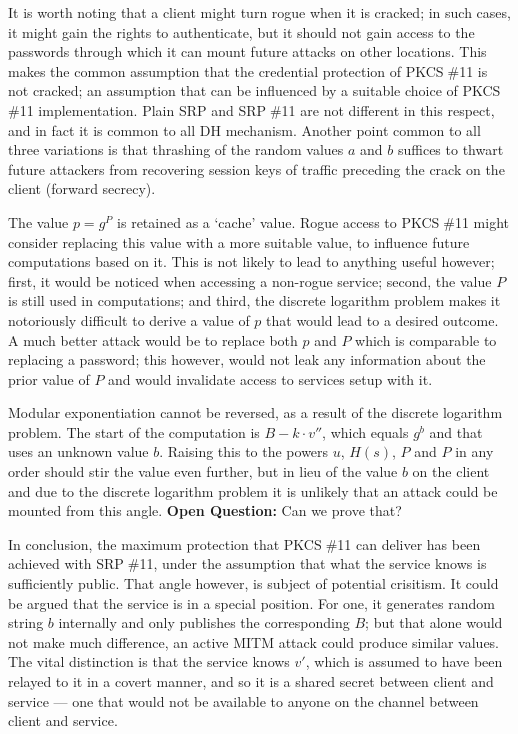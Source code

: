 \documentclass[a4paper,11pt]{article}
\def\pkcs11{PKCS$\;$\#11\xspace}
\def\srp11{SRP$\;$\#11\xspace}
\begin{document}
It is worth noting that a client might turn rogue when it is cracked; in such cases, it might gain the rights to authenticate, but it should not gain access to the passwords through which it can mount future attacks on other locations.  This makes the common assumption that the credential protection of \pkcs11 is not cracked; an assumption that can be influenced by a suitable choice of \pkcs11 implementation.  Plain SRP and \srp11 are not different in this respect, and in fact it is common to all DH mechanism.  Another point common to all three variations is that thrashing of the random values $a$ and $b$ suffices to thwart future attackers from recovering session keys of traffic preceding the crack on the client (forward secrecy).

The value $p=g^P$ is retained as a `cache' value.  Rogue access to \pkcs11 might consider replacing this value with a more suitable value, to influence future computations based on it.  This is not likely to lead to anything useful however; first, it would be noticed when accessing a non-rogue service; second, the value $P$ is still used in computations; and third, the discrete logarithm problem makes it notoriously difficult to derive a value of $p$ that would lead to a desired outcome.  A much better attack would be to replace both $p$ and $P$ which is comparable to replacing a password; this however, would not leak any information about the prior value of $P$ and would invalidate access to services setup with it.

Modular exponentiation cannot be reversed, as a result of the discrete logarithm problem.  The start of the computation is $B-k\cdot v''$, which equals $g^b$ and that uses an unknown value $b$.  Raising this to the powers $u$, $H(s)$, $P$ and $P$ in any order should stir the value even further, but in lieu of the value $b$ on the client and due to the discrete logarithm problem it is unlikely that an attack could be mounted from this angle.  \textbf{Open Question:} Can we prove that?

In conclusion, the maximum protection that \pkcs11 can deliver has been achieved with \srp11, under the assumption that what the service knows is sufficiently public.  That angle however, is subject of potential crisitism.  It could be argued that the service is in a special position.  For one, it generates random string $b$ internally and only publishes the corresponding $B$; but that alone would not make much difference, an active MITM attack could produce similar values. The vital distinction is that the service knows $v'$, which is assumed to have been relayed to it in a covert manner, and so it is a shared secret between client and service --- one that would not be available to anyone on the channel between client and service.
\end{document}
